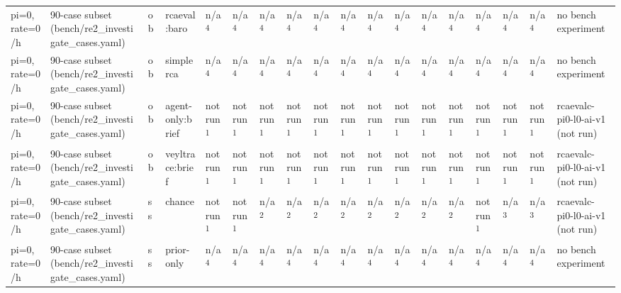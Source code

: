 \begin{table}[t]
\begin{tabular}{llllllllllllllllll}
pi=0, rate=0/h & 90-case subset (bench/re2\_investigate\_cases.yaml) & ob & rcaeval:baro & n/a\textsuperscript{4} & n/a\textsuperscript{4} & n/a\textsuperscript{4} & n/a\textsuperscript{4} & n/a\textsuperscript{4} & n/a\textsuperscript{4} & n/a\textsuperscript{4} & n/a\textsuperscript{4} & n/a\textsuperscript{4} & n/a\textsuperscript{4} & n/a\textsuperscript{4} & n/a\textsuperscript{4} & n/a\textsuperscript{4} & no bench experiment \\
pi=0, rate=0/h & 90-case subset (bench/re2\_investigate\_cases.yaml) & ob & simplerca & n/a\textsuperscript{4} & n/a\textsuperscript{4} & n/a\textsuperscript{4} & n/a\textsuperscript{4} & n/a\textsuperscript{4} & n/a\textsuperscript{4} & n/a\textsuperscript{4} & n/a\textsuperscript{4} & n/a\textsuperscript{4} & n/a\textsuperscript{4} & n/a\textsuperscript{4} & n/a\textsuperscript{4} & n/a\textsuperscript{4} & no bench experiment \\
pi=0, rate=0/h & 90-case subset (bench/re2\_investigate\_cases.yaml) & ob & agent-only:brief & not run\textsuperscript{1} & not run\textsuperscript{1} & not run\textsuperscript{1} & not run\textsuperscript{1} & not run\textsuperscript{1} & not run\textsuperscript{1} & not run\textsuperscript{1} & not run\textsuperscript{1} & not run\textsuperscript{1} & not run\textsuperscript{1} & not run\textsuperscript{1} & not run\textsuperscript{1} & not run\textsuperscript{1} & rcaevalc-pi0-l0-ai-v1 (not run) \\
pi=0, rate=0/h & 90-case subset (bench/re2\_investigate\_cases.yaml) & ob & veyltrace:brief & not run\textsuperscript{1} & not run\textsuperscript{1} & not run\textsuperscript{1} & not run\textsuperscript{1} & not run\textsuperscript{1} & not run\textsuperscript{1} & not run\textsuperscript{1} & not run\textsuperscript{1} & not run\textsuperscript{1} & not run\textsuperscript{1} & not run\textsuperscript{1} & not run\textsuperscript{1} & not run\textsuperscript{1} & rcaevalc-pi0-l0-ai-v1 (not run) \\
pi=0, rate=0/h & 90-case subset (bench/re2\_investigate\_cases.yaml) & ss & chance & not run\textsuperscript{1} & not run\textsuperscript{1} & n/a\textsuperscript{2} & n/a\textsuperscript{2} & n/a\textsuperscript{2} & n/a\textsuperscript{2} & n/a\textsuperscript{2} & n/a\textsuperscript{2} & n/a\textsuperscript{2} & n/a\textsuperscript{2} & not run\textsuperscript{1} & n/a\textsuperscript{3} & n/a\textsuperscript{3} & rcaevalc-pi0-l0-ai-v1 (not run) \\
pi=0, rate=0/h & 90-case subset (bench/re2\_investigate\_cases.yaml) & ss & prior-only & n/a\textsuperscript{4} & n/a\textsuperscript{4} & n/a\textsuperscript{4} & n/a\textsuperscript{4} & n/a\textsuperscript{4} & n/a\textsuperscript{4} & n/a\textsuperscript{4} & n/a\textsuperscript{4} & n/a\textsuperscript{4} & n/a\textsuperscript{4} & n/a\textsuperscript{4} & n/a\textsuperscript{4} & n/a\textsuperscript{4} & no bench experiment \\

\end{tabular}
\end{table}
